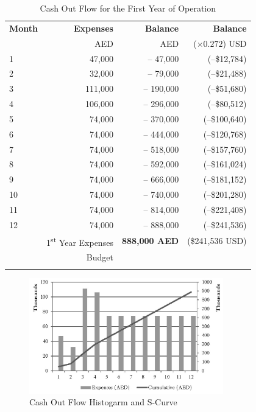 \documentclass[a4paper,oneside,12pt,final]{article}
\begin{document}
\begin{table}[h]
	\centering
	\begin{tabular}{lrrr}
	\toprule
	\textbf{Month}&\textbf{Expenses}&\textbf{Balance}&\textbf{Balance}\\ 
	&\footnotesize{AED}&\footnotesize{AED}&\footnotesize{($\times{}0.272$)} USD\vspace{0.2cm}\\ 
	\midrule
	\normalsize
	1&47,000 &-- 47,000&(--\$12,784)\\
	2&32,000 &-- 79,000&(--\$21,488)\\
	3&111,000 &-- 190,000&(--\$51,680)\\
	4&106,000 &-- 296,000&(--\$80,512)\\
	5&74,000 &-- 370,000&(--\$100,640)\\
	6&74,000 &-- 444,000&(--\$120,768)\\
	7&74,000 &-- 518,000&(--\$157,760)\\
	8&74,000 &-- 592,000&(--\$161,024)\\
	9&74,000 &-- 666,000&(--\$181,152)\\
	10&74,000 &-- 740,000&(--\$201,280)\\
	11&74,000 &-- 814,000&(--\$221,408)\\
	12&74,000 &-- 888,000&(--\$241,536)\\
	\midrule
	&1\textsuperscript{st} Year Expenses&\textbf{888,000 AED}&(\$241,536 USD)\\
	&Budget&&\\
	\bottomrule
	\label{tab:cashflow}
	\end{tabular}
	\caption{Cash Out Flow for the First Year of Operation}
\end{table}

\begin{figure}[h!]
	\centering
	\includegraphics[width=0.75\textwidth]{./Histogram}
	\caption{Cash Out Flow Histogarm and S-Curve}
	\label{fig:histogram}
\end{figure}
\end{document}
